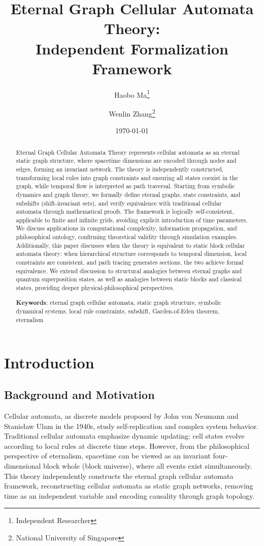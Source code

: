 \documentclass[11pt]{article}
\title{Eternal Graph Cellular Automata Theory:\\ Independent Formalization Framework}
\author{Haobo Ma\thanks{Independent Researcher} \and Wenlin Zhang\thanks{National University of Singapore}}
\date{\today}
\theoremstyle{definition}
\theoremstyle{remark}
\begin{document}
\maketitle

\begin{abstract}
Eternal Graph Cellular Automata Theory represents cellular automata as an eternal static graph structure, where spacetime dimensions are encoded through nodes and edges, forming an invariant network. The theory is independently constructed, transforming local rules into graph constraints and ensuring all states coexist in the graph, while temporal flow is interpreted as path traversal. Starting from symbolic dynamics and graph theory, we formally define eternal graphs, state constraints, and subshifts (shift-invariant sets), and verify equivalence with traditional cellular automata through mathematical proofs. The framework is logically self-consistent, applicable to finite and infinite grids, avoiding explicit introduction of time parameters. We discuss applications in computational complexity, information propagation, and philosophical ontology, confirming theoretical validity through simulation examples. Additionally, this paper discusses when the theory is equivalent to static block cellular automata theory: when hierarchical structure corresponds to temporal dimension, local constraints are consistent, and path tracing generates sections, the two achieve formal equivalence. We extend discussion to structural analogies between eternal graphs and quantum superposition states, as well as analogies between static blocks and classical states, providing deeper physical-philosophical perspectives.

\noindent\textbf{Keywords}: eternal graph cellular automata, static graph structure, symbolic dynamical systems, local rule constraints, subshift, Garden-of-Eden theorem, eternalism
\end{abstract}

\section{Introduction}

\subsection{Background and Motivation}

Cellular automata, as discrete models proposed by John von Neumann and Stanisław Ulam in the 1940s, study self-replication and complex system behavior. Traditional cellular automata emphasize dynamic updating: cell states evolve according to local rules at discrete time steps. However, from the philosophical perspective of eternalism, spacetime can be viewed as an invariant four-dimensional block whole (block universe), where all events exist simultaneously. This theory independently constructs the eternal graph cellular automata framework, reconstructing cellular automata as static graph networks, removing time as an independent variable and encoding causality through graph topology.
\end{document}
